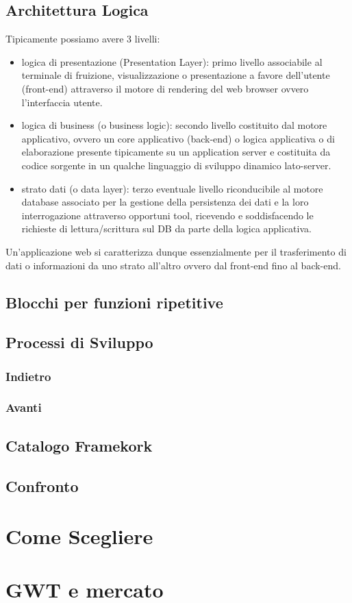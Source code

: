 	  \subsection{Architettura Logica}
		  Tipicamente possiamo avere 3 livelli:
	  \begin{itemize}
	   \item  logica di presentazione (Presentation Layer): primo livello associabile al terminale di fruizione, 
		  visualizzazione o presentazione a favore dell'utente (front-end) attraverso il motore di rendering del 
		  web browser ovvero l'interfaccia utente.
	   \item  logica di business (o business logic): secondo livello costituito dal motore applicativo, ovvero un core applicativo (back-end) 
		   o logica applicativa o di elaborazione presente tipicamente su un application server e 
		   costituita da codice sorgente in un qualche linguaggio di sviluppo dinamico lato-server.
	   \item strato dati (o data layer): terzo eventuale livello riconducibile al motore database associato 
		 per la gestione della persistenza dei dati e la loro interrogazione attraverso opportuni tool, 
		 ricevendo e soddisfacendo le richieste di lettura/scrittura sul DB da parte della logica applicativa.
	  \end{itemize}
	    Un'applicazione web si caratterizza dunque essenzialmente per il trasferimento di dati o informazioni da uno strato all'altro ovvero dal front-end fino al back-end.
	  \subsection{Blocchi per funzioni ripetitive}
	  \subsection{Processi di Sviluppo}
		      \subsubsection{Indietro}
		      \subsubsection{Avanti}
	  \subsection{Catalogo Framekork}
	  \subsection{Confronto}
\section{Come Scegliere}
\section{GWT e mercato}
 